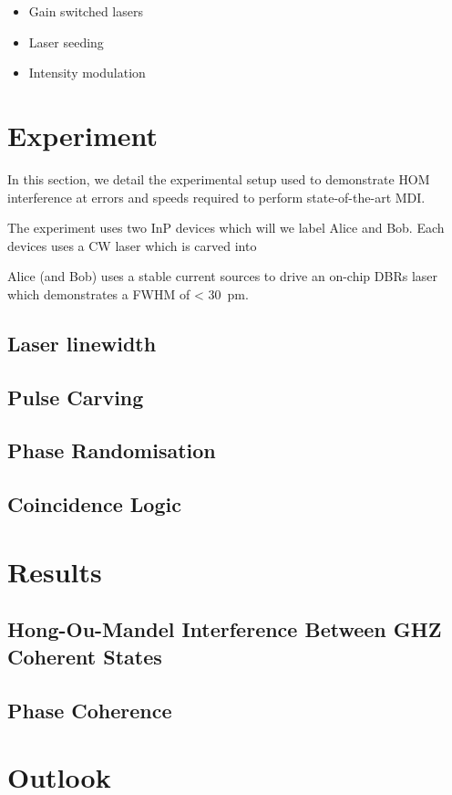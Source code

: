 \begin{itemize}
	\item Gain switched lasers
	\item Laser seeding
	\item Intensity modulation
\end{itemize}

\section{Experiment}

In this section, we detail the experimental setup used to demonstrate \ac{HOM} interference at errors and speeds required to perform state-of-the-art \ac{MDI}.

The experiment uses two \ac{InP} devices which will we label Alice and Bob. Each devices uses a \ac{CW} laser which is carved into  

Alice (and Bob) uses a stable current sources to drive an on-chip \acp{DBR} laser which demonstrates a \ac{FWHM} of < \SI{30}{\pico\metre}.

\subsection{Laser linewidth}

\subsection{Pulse Carving}

\subsection{Phase Randomisation}

\subsection{Coincidence Logic}

\section{Results}

\subsection{Hong-Ou-Mandel Interference Between GHZ Coherent States}

\subsection{Phase Coherence}

\section{Outlook}

